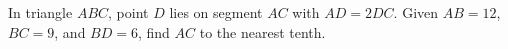 In triangle $ABC$, point $D$ lies on segment $AC$ with $AD=2DC$. Given $AB=12$, $BC=9$, and $BD=6$, find $AC$ to the nearest tenth.
